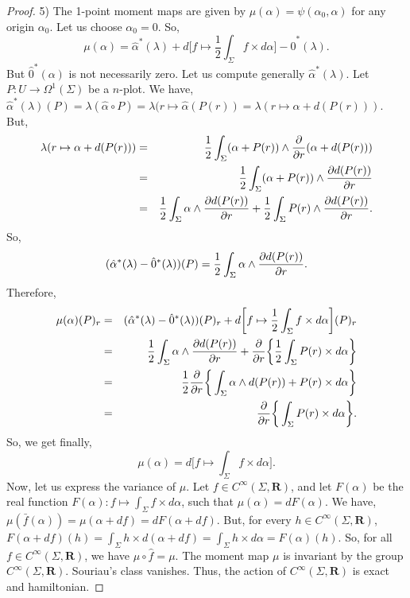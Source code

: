\documentclass[10pt,reqno,twoside]{amsart}
\newcommand{\RR}{\mathbf{R}}
\newcommand{\Cinfty}{C^\infty}
\newcommand{\undemi}{\frac{1}{2}}
\newcommand{\source}{\hat{0}}
\theoremstyle{plain}
\theoremstyle{definition}
\begin{document}
\begin{proof}
    5) The 1-point moment maps are given by $\mu(\alpha) = \psi(\alpha_0,\alpha)$ for any origin $\alpha_0$.
    Let us choose $\alpha_0 = 0$.
    So,
    $$
      \mu(\alpha) = \hat \alpha^*(\lambda) + d \bigg[f \mapsto \undemi \int_\Sigma f \times d\alpha \bigg] - \source^*(\lambda).
      $$
    But $\source^*(\alpha)$ is not necessarily zero.
    Let us compute generally $\hat \alpha^*(\lambda)$.
    Let $P : U \to \Omega^1(\Sigma)$ be a $n$-plot.
    We have,
    $\hat \alpha^*(\lambda)(P) = \lambda(\hat \alpha \circ P) = \lambda(r \mapsto \hat \alpha(P (r)) = \lambda(r \mapsto \alpha + d(P (r)))$.
    But,
    \begin{eqnarray*}
      \lambda(r \mapsto \alpha + d(P (r))) & = & \undemi \int_\Sigma (\alpha + P (r)) \wedge {\partial \over \partial r}(\alpha + d(P (r))) \\
      & = & \undemi \int_\Sigma (\alpha + P (r)) \wedge {\partial d(P (r)) \over \partial r} \\
      & = & \undemi \int_\Sigma \alpha \wedge {\partial d(P (r)) \over \partial r} + \undemi \int_\Sigma P (r) \wedge {\partial d(P (r)) \over \partial r}.
    \end{eqnarray*}
    So,
    $$
      (\hat \alpha^*(\lambda) - \source^*(\lambda))(P) = \undemi \int_\Sigma \alpha \wedge {\partial d(P (r)) \over \partial r}.
      $$
    Therefore,
    \begin{eqnarray*}
      \mu(\alpha)(P)_r & = & (\hat \alpha^*(\lambda) - \source^*(\lambda))(P)_r + d \bigg[f \mapsto \undemi \int_\Sigma f \times d\alpha\bigg](P)_r \\
      & = & \undemi \int_\Sigma \alpha \wedge {\partial d(P (r)) \over \partial r} + {\partial \over \partial r} \bigg\{ \undemi \int_\Sigma P (r) \times d \alpha \bigg\} \\
      & = & \undemi {\partial \over \partial r} \bigg\{ \int_\Sigma \alpha \wedge d(P (r)) + P (r) \times d\alpha \bigg\} \\
      & = & {\partial \over \partial r} \bigg\{ \int_\Sigma P (r) \times d\alpha \bigg\}.
    \end{eqnarray*}
    So,
    we get finally,
    $$
      \mu(\alpha) = d \bigg[ f \mapsto \int_\Sigma f \times d\alpha \bigg].
      $$
    Now,
    let us express the variance of $\mu$.
    Let $f \in \Cinfty(\Sigma,\RR)$,
    and let $F(\alpha)$ be the real function $F(\alpha) : f \mapsto \int_\Sigma f \times d\alpha$,
    such that $\mu(\alpha) = dF(\alpha)$.
    We have,
    $\mu(\bar f(\alpha)) = \mu (\alpha + df) = dF(\alpha + df)$.
    But,
    for every $h \in \Cinfty(\Sigma,\RR)$,
    $F(\alpha + df)(h) = \int_\Sigma h \times d(\alpha + df) = \int_\Sigma h \times d\alpha = F(\alpha)(h)$.
    So,
    for all $f \in \Cinfty(\Sigma,\RR)$,
    we have $\mu \circ \hat f = \mu$.
    The moment map $\mu$ is invariant by the group $\Cinfty(\Sigma,\RR)$.
    Souriau's class vanishes.
    Thus,
    the action of $\Cinfty(\Sigma,\RR)$ is exact and hamiltonian.
    

\end{proof}
\end{document}
